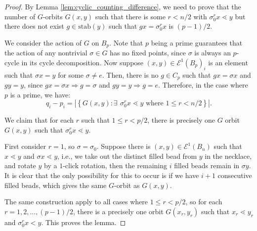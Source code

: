 \documentclass[10 pt]{amsart}
\theoremstyle{plain}
\theoremstyle{definition}
\theoremstyle{remark}
\numberwithin{equation}{section}
\newcommand{\so}{\Rightarrow}
\begin{document}
\begin{proof}  By Lemma \ref{lem:cyclic_counting_difference}, we need to prove that the number of $G$-orbits $G(x,y)$ such that there is some $r < n/2$ with $\sigma_0^r x \lessdot y$ but there does not exist $g \in \text{stab}(y)$ such that $gx = \sigma_0^r x$ is $(p-1)/2.$ 

 We consider the action of $G$ on $B_p$. 
 Note that $p$ being a prime guarantees that the action of any nontrivial $\sigma \in G$ has no fixed points, since $\sigma$ is always an $p$-cycle in its cycle decomposition. Now suppose $(x, y) \in \mathcal E^1(B_p)_i$  is an element such that $\sigma x =y$ for some $\sigma \neq e$. Then, there is no $g \in C_p$ such that $gx = \sigma x$ and $g y = y$, since $gx = \sigma x \so g = \sigma $ and $g y = y \so g = e$. Therefore, in the case where $p$ is a prime,  we have: 
 $$q_i - p_i = |\left\{G{(x, y)} : \exists \: \, \sigma_0^r x \lessdot y \text{ where } 1 \le r < n/2 \right\}|.$$


We claim that for each $r$ such that $1 \le r < p/2$, there is precisely one $G$ orbit $G(x, y)$ such that $\sigma_0^r x \lessdot y$. 

First consider $r = 1$, so $\sigma = \sigma_0$. Suppose there is $(x,y) \in \mathcal E^1(B_n)$ such that $x \lessdot y$ and $\sigma x \lessdot y$, i.e., we take out the distinct filled bead from $y$ in the necklace, and rotate $y$ by a $1$-click rotation, then the remaining $i$ filled beads remain in $\sigma y$. It is clear that the only possibility for this to occur is if we have $i+1$ consecutive filled beads, which gives the same $G$-orbit as $G(x, y)$.

The same construction apply to all cases where $1 \le r < p/2$, so for each $r = 1, 2, ..., (p-1)/2$, there is a precisely one orbit $G(x_r,y_r)$ such that $x_r \lessdot y_r$ and $\sigma_0^r  x < y$. This proves the lemma.
\end{proof}
\end{document}
